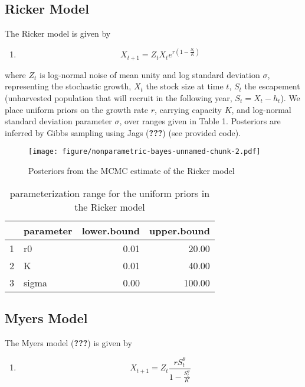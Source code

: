 \documentclass[author-year, review]{elsarticle} %
\makeatletter
\def\maxwidth{\ifdim\Gin@nat@width>\linewidth\linewidth
\else\Gin@nat@width\fi}
\let\Oldincludegraphics\includegraphics
\renewcommand{\includegraphics}[1]{\Oldincludegraphics[width=\maxwidth]{#1}}
\makeatother
\begin{document}
\subsection{Ricker Model}\label{ricker-model}

The Ricker model is given by

\begin{enumerate}
\def\labelenumi{(\arabic{enumi})}
\itemsep1pt\parskip0pt
\item
  \[X_{t+1} = Z_t X_t e^{r \left(1 - \frac{S_t}{K} \right) } \]
\end{enumerate}

where $Z_t$ is log-normal noise of mean unity and log standard deviation
$\sigma$, representing the stochastic growth, $X_t$ the stock size at
time $t$, $S_t$ the escapement (unharvested population that will recruit
in the following year, $S_t = X_t - h_t$). We place uniform priors on
the growth rate $r$, carrying capacity $K$, and log-normal standard
deviation parameter $\sigma$, over ranges given in Table 1. Posteriors
are inferred by Gibbs sampling using Jags ({\textbf{???}}) (see provided
code).

\begin{figure}[htbp]
\centering
\texttt{[image: figure/nonparametric-bayes-unnamed-chunk-2.pdf]}
\caption{Posteriors from the MCMC estimate of the Ricker model}
\end{figure}

\begin{table}[ht]
\begin{center}
\begin{tabular}{rlrr}
  \hline
 & parameter & lower.bound & upper.bound \\ 
  \hline
1 & r0 & 0.01 & 20.00 \\ 
  2 & K & 0.01 & 40.00 \\ 
  3 & sigma & 0.00 & 100.00 \\ 
   \hline
\end{tabular}
\caption{parameterization range for the uniform priors in the Ricker model}
\end{center}
\end{table}

\subsection{Myers Model}\label{myers-model}

The Myers model ({\textbf{???}}) is given by

\begin{enumerate}
\def\labelenumi{(\arabic{enumi})}
\setcounter{enumi}{1}
\itemsep1pt\parskip0pt
\item
  \[ X_{t+1} = Z_t \frac{r S_t^{\theta}}{1 - \frac{S_t^\theta}{K}}\]
\end{enumerate}
\end{document}
